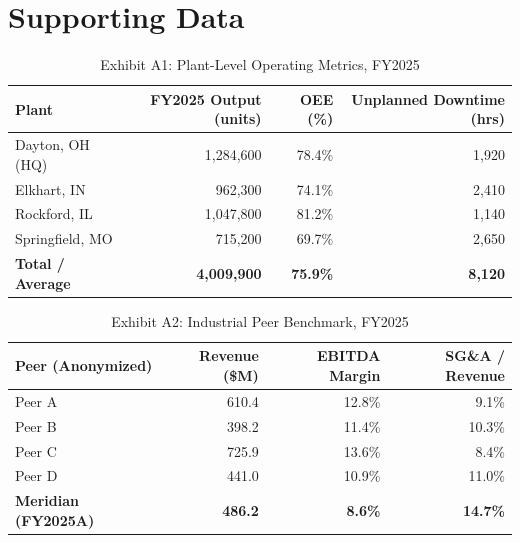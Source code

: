\section{Supporting Data}

\begin{table}[htbp]
\centering
\small
\begin{tabular}{@{}lrrr@{}}
\toprule
\textbf{Plant} & \textbf{FY2025 Output (units)} & \textbf{OEE (\%)} & \textbf{Unplanned Downtime (hrs)} \\
\midrule
Dayton, OH (HQ)     & 1,284,600 & 78.4\% & 1,920 \\
Elkhart, IN         & 962,300   & 74.1\% & 2,410 \\
Rockford, IL        & 1,047,800 & 81.2\% & 1,140 \\
Springfield, MO     & 715,200   & 69.7\% & 2,650 \\
\midrule
\rowcolor{lightgrey}
\textbf{Total / Average} & \textbf{4,009,900} & \textbf{75.9\%} & \textbf{8,120} \\
\bottomrule
\end{tabular}
\caption{Exhibit A1: Plant-Level Operating Metrics, FY2025}
\end{table}

\begin{table}[htbp]
\centering
\small
\begin{tabular}{@{}lrrr@{}}
\toprule
\textbf{Peer (Anonymized)} & \textbf{Revenue (\$M)} & \textbf{EBITDA Margin} & \textbf{SG\&A / Revenue} \\
\midrule
Peer A & 610.4 & 12.8\% & 9.1\% \\
Peer B & 398.2 & 11.4\% & 10.3\% \\
Peer C & 725.9 & 13.6\% & 8.4\% \\
Peer D & 441.0 & 10.9\% & 11.0\% \\
\midrule
\rowcolor{lightgrey}
\textbf{Meridian (FY2025A)} & \textbf{486.2} & \textbf{8.6\%} & \textbf{14.7\%} \\
\bottomrule
\end{tabular}
\caption{Exhibit A2: Industrial Peer Benchmark, FY2025}
\end{table}
